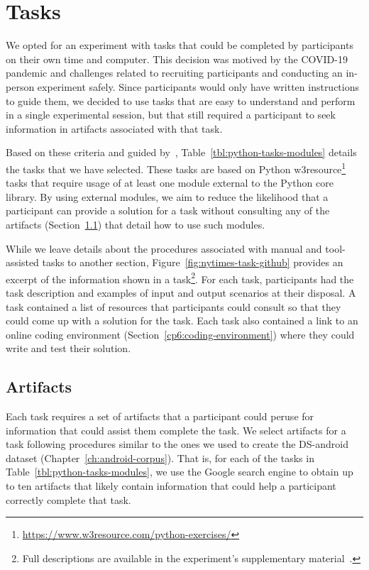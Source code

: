 
\section{Tasks}
\label{cp6:tasks}


We opted for an experiment with tasks that could be completed by participants on their own time and computer.
This decision was motived by the COVID-19 pandemic and challenges related to recruiting participants and conducting an in-person experiment safely\red{~\cite{}}. 
Since participants would only have written instructions to guide them, we decided to use tasks that are easy to understand and perform in a single experimental session, but that still required a participant  
to seek information in artifacts associated with that task.



Based on these criteria and guided by~\cite{thiselton2019},
Table~\ref{tbl:python-tasks-modules} details the tasks that we have selected. 
These tasks are based on 
Python w3resource\footnote{\url{https://www.w3resource.com/python-exercises/}} tasks
that require usage of at least one module external to the Python core library.
By using external modules, we aim to reduce the likelihood that a participant 
can provide a solution for a task without consulting any of the artifacts (Section~\ref{cp6:experiment-artifacts})
that detail how to use such modules. 



While we leave details about the procedures associated with manual and tool-assisted tasks to another section, Figure~\ref{fig:nytimes-task-github} provides an excerpt of the information shown in a task\footnote{Full descriptions are available in the experiment's supplementary material~\red{\cite{}}.}.
For each task, participants had the task description and examples of input and output scenarios at their disposal. A task contained a list of resources that participants could consult 
so that they could come up with a solution for the task.
Each task also contained a link to an online coding environment (Section~\ref{cp6:coding-environment})
where they could write and test their solution. 





\subsection{Artifacts}
\label{cp6:experiment-artifacts}


Each task requires a set of artifacts that a participant could peruse for information that could assist them complete the task.
We select artifacts for a task following procedures similar to the ones we used to create the \acs{DS-android} dataset (Chapter~\ref{ch:android-corpus}). 
That is, for each of the tasks in Table~\ref{tbl:python-tasks-modules}, we use the Google search engine to obtain up to ten artifacts that likely contain 
information that could help a participant correctly complete that task. 


